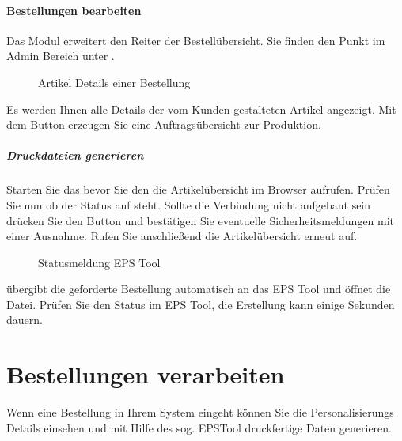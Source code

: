 \documentclass[letterpaper,10pt,ngerman]{sphinxmanual}
\begin{document}
\paragraph{Bestellungen bearbeiten}
\label{\detokenize{modules/oxid/orders:bestellungen-bearbeiten}}\label{\detokenize{modules/oxid/orders::doc}}
Das Modul erweitert den Reiter  der Bestellübersicht. Sie finden den Punkt im Admin Bereich unter
.

\begin{figure}[htbp]
\centering
\capstart

\noindent{}
\caption{Artikel Details einer Bestellung}\label{\detokenize{modules/oxid/orders:id1}}\end{figure}

Es werden Ihnen alle Details der vom Kunden gestalteten Artikel angezeigt. Mit dem Button 
erzeugen Sie eine Auftragsübersicht zur Produktion.


\subparagraph{Druckdateien generieren}
\label{\detokenize{modules/oxid/orders:druckdateien-generieren}}
Starten Sie das {\hyperref[\detokenize{tools/epstool::doc}]{}} bevor Sie den die Artikelübersicht im Browser aufrufen. Prüfen Sie nun
ob der Status  auf  steht. Sollte die Verbindung nicht aufgebaut sein drücken Sie
den Button  und bestätigen Sie eventuelle Sicherheitsmeldungen mit einer Ausnahme.
Rufen Sie anschließend die Artikelübersicht erneut auf.

\begin{figure}[htbp]
\centering
\capstart

\noindent{}
\caption{Statusmeldung EPS Tool}\label{\detokenize{modules/oxid/orders:id2}}\end{figure}

 übergibt die geforderte Bestellung automatisch an das EPS Tool und öffnet die Datei.
Prüfen Sie den Status im EPS Tool, die Erstellung kann einige Sekunden dauern.


\section{Bestellungen verarbeiten}
\label{\detokenize{intro/orders:bestellungen-verarbeiten}}\label{\detokenize{intro/orders::doc}}
Wenn eine Bestellung in Ihrem System eingeht können Sie die Personalisierungs Details einsehen und mit Hilfe des sog.
EPS\sphinxhyphen{}Tool druckfertige Daten generieren.
\end{document}
